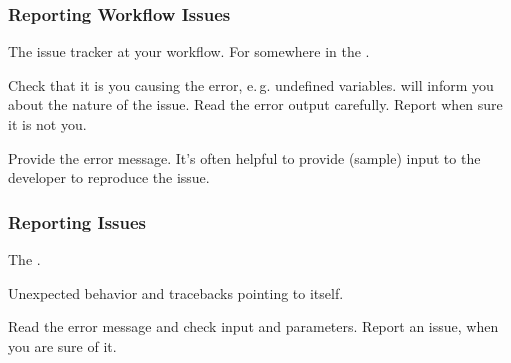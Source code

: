\begin{frame}
\begin{adjustbox}{max totalsize={.9\textwidth}{.7\textheight},center}
	
	\end{adjustbox}
\end{frame}

\begin{frame}
	\frametitle{Reporting Workflow Issues}
	\begin{question}[Where?]
		The issue tracker at your workflow. For \Snakemake{} somewhere in the . 
	\end{question}
	\pause
	\begin{question}[What?]
	   Check that it is you causing the error, e.\,g. undefined variables. \Snakemake{} will inform you about the nature of the issue. Read the error output carefully. Report when sure it is not you.
	\end{question}
	\pause
	\begin{question}[How?]
		Provide the error message. It's often helpful to provide (sample) input to the developer to reproduce the issue.
	\end{question}
\end{frame}

\begin{frame}
  \frametitle{Reporting \Snakemake{} Issues}
  \begin{question}[Where?]
  	 The .
  \end{question}	
  \pause
  \begin{question}[What?]
  	Unexpected behavior and tracebacks pointing to \Snakemake{} itself. 
  \end{question}
  \pause
  \begin{question}[How?]
  	Read the error message and check input and parameters. Report an issue, when you are sure of it.
  \end{question}
\end{frame}

